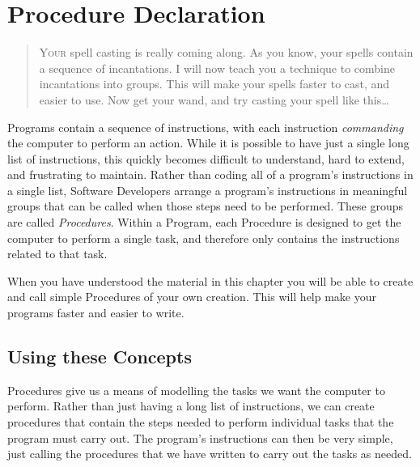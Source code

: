 \chapter{Procedure Declaration} %
\label{cha:procedure_declaration}

\begin{quote}
  \Fontlukas\Large
  \renewcommand{\LettrineTextFont}{\relax}
  \lettrine[image=true,lines=3,lraise=0.1]
  {Y}{our} spell casting is really coming along. As you know, your spells contain a sequence of incantations. I will now teach you a technique to combine incantations into groups. This will make your spells faster to cast, and easier to use. Now get your wand, and try casting your spell like this\ldots
\end{quote}

\bigskip

Programs contain a sequence of instructions, with each instruction \emph{commanding} the computer to perform an action. While it is possible to have just a single long list of instructions, this quickly becomes difficult to understand, hard to extend, and frustrating to maintain. Rather than coding all of a program's instructions in a single list, Software Developers arrange a program's instructions in meaningful groups that can be called when those steps need to be performed. These groups are called \emph{Procedures}. Within a Program, each Procedure is designed to get the computer to perform a single task, and therefore only contains the instructions related to that task.

When you have understood the material in this chapter you will be able to create and call simple Procedures of your own creation. This will help make your programs faster and easier to write.

\minitoc





\clearpage
\section{Using these Concepts} %
\label{sec:using_these_concepts_procedure_decl}

Procedures give us a means of modelling the tasks we want the computer to perform. Rather than just having a long list of instructions, we can create procedures that contain the steps needed to perform individual tasks that the program must carry out. The program's instructions can then be very simple, just calling the procedures that we have written to carry out the tasks as needed.

